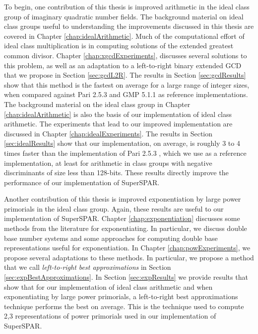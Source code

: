 \documentclass{ucalgthes1}
\theoremstyle{definition}
\newcommand{\GMP}{GMP 5.1.1}
\newcommand{\Pari}{Pari 2.5.3}
\begin{document}
To begin, one contribution of this thesis is improved arithmetic in the ideal class group of imaginary quadratic number fields.  The background material on ideal class groups useful to understanding the improvements discussed in this thesis are covered in Chapter \ref{chap:idealArithmetic}.  Much of the computational effort of ideal class multiplication is in computing solutions of the extended greatest common divisor.  Chapter \ref{chap:xgcdExperiments}, discusses several solutions to this problem, as well as an adaptation to a left-to-right binary extended GCD that we propose in Section \ref{sec:gcdL2R}.  The results in Section \ref{sec:gcdResults} show that this method is the fastest on average for a large range of integer sizes, when compared against \Pari{} \cite{PariGP} and \GMP{} \cite{Gmp} as reference implementations.  The background material on the ideal class group in Chapter \ref{chap:idealArithmetic} is also the basis of our implementation of ideal class arithmetic.  The experiments that lead to our improved implementation are discussed in Chapter \ref{chap:idealExperiments}.  The results in Section \ref{sec:idealResults} show that our implementation, on average, is roughly 3 to 4 times faster than the implementation of \Pari{} \cite{PariGP}, which we use as a reference implementation, at least for arithmetic in class groups with negative discriminants of size less than 128-bits.  These results directly improve the performance of our implementation of SuperSPAR.

Another contribution of this thesis is improved exponentiation by large power primorials in the ideal class group.  Again, these results are useful to our implementation of SuperSPAR.  Chapter \ref{chap:exponentiation} discusses some methods from the literature for exponentiating.  In particular, we discuss double base number systems and some approaches for computing double base representations useful for exponentiation.  In Chapter \ref{chap:powExperiments}, we propose several adaptations to these methods.  In particular, we propose a method that we call \emph{left-to-right best approximations} in Section \ref{sec:expBestApproximations}.  In Section \ref{sec:expResults} we provide results that show that for our implementation of ideal class arithmetic and when exponentiating by large power primorials, a left-to-right best approximations technique performs the best on average.  This is the technique used to compute 2,3 representations of power primorials used in our implementation of SuperSPAR.
\end{document}
